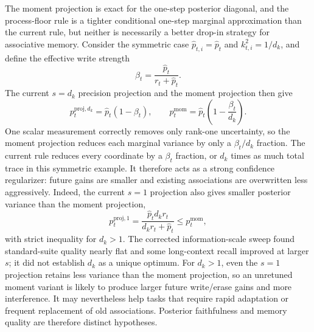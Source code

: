 \documentclass[11pt]{article}
\begin{document}
The moment projection is exact for the one-step posterior diagonal, and the process-floor rule is
a tighter conditional one-step marginal approximation than the current rule, but neither is
necessarily a better drop-in strategy for associative memory. Consider the symmetric case
$\widehat p_{t,i}=\widehat p_t$ and $k_{t,i}^2=1/d_k$, and define the effective write strength
\begin{equation}
  \beta_t
  = \frac{\widehat p_t}{r_t+\widehat p_t}.
  \label{eq:discussion-symmetric-beta}
\end{equation}
The current $s=d_k$ precision projection and the moment projection then give
\begin{equation}
  p_t^{\mathrm{proj},d_k}
  = \widehat p_t(1-\beta_t),
  \qquad
  p_t^{\mathrm{mom}}
  = \widehat p_t\left(1-\frac{\beta_t}{d_k}\right).
  \label{eq:discussion-proj-versus-moment}
\end{equation}
One scalar measurement correctly removes only rank-one uncertainty, so the moment projection
reduces each marginal variance by only a $\beta_t/d_k$ fraction. The current rule reduces every
coordinate by a $\beta_t$ fraction, or $d_k$ times as much total trace in this symmetric example.
It therefore acts as a strong confidence regularizer: future gains are smaller and existing
associations are overwritten less aggressively. Indeed, the current $s=1$ projection also gives
smaller posterior variance than the moment projection,
\begin{equation}
  p_t^{\mathrm{proj},1}
  = \frac{\widehat p_t d_k r_t}{d_k r_t+\widehat p_t}
  \leq p_t^{\mathrm{mom}},
  \label{eq:discussion-proj-one-versus-moment}
\end{equation}
with strict inequality for $d_k>1$.
The corrected information-scale sweep found standard-suite quality nearly flat and some
long-context recall improved at larger $s$; it did not establish $d_k$ as a unique optimum.
For $d_k>1$, even the $s=1$ projection retains less variance than the moment projection, so an
unretuned moment variant is likely to produce larger future write/erase gains and more
interference. It may nevertheless help tasks that require rapid adaptation or frequent replacement
of old associations. Posterior faithfulness and memory quality are therefore distinct hypotheses.
\end{document}
